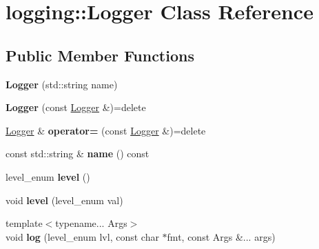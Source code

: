 \hypertarget{classlogging_1_1Logger}{}\section{logging\+::Logger Class Reference}
\label{classlogging_1_1Logger}
\subsection*{Public Member Functions}
\begin{DoxyCompactItemize}
\item 
\mbox{\label{classlogging_1_1Logger_abcc3c11a5d2c676403f69d943a9ae001}} 
{\bfseries Logger} (std\+::string name)
\item 
\mbox{\label{classlogging_1_1Logger_a7c38500187960d6849411aa37b426506}} 
{\bfseries Logger} (const \mbox{\hyperlink{classlogging_1_1Logger}{Logger}} \&)=delete
\item 
\mbox{\label{classlogging_1_1Logger_ab78f0150de2caf60d13d24fc6a6e244e}} 
\mbox{\hyperlink{classlogging_1_1Logger}{Logger}} \& {\bfseries operator=} (const \mbox{\hyperlink{classlogging_1_1Logger}{Logger}} \&)=delete
\item 
\mbox{\label{classlogging_1_1Logger_a05497cc7118ccde7e83387e0c4ae4c2d}} 
const std\+::string \& {\bfseries name} () const
\item 
\mbox{\label{classlogging_1_1Logger_aeb9985179cb57ad07095191891d81bf4}} 
level\+\_\+enum {\bfseries level} ()
\item 
\mbox{\label{classlogging_1_1Logger_af9c1d197602912a233406440ebd98e2c}} 
void {\bfseries level} (level\+\_\+enum val)
\item 
\mbox{\label{classlogging_1_1Logger_a36b8c67383917dc85fc30ad652f97102}} 
{\footnotesize template$<$typename... Args$>$ }\\void {\bfseries log} (level\+\_\+enum lvl, const char $\ast$fmt, const Args \&... args)
\item 
\mbox{\label{classlogging_1_1Logger_a5c98f92df5a65614b62d836ab75ae7fc}} 

\end{DoxyCompactItemize}
